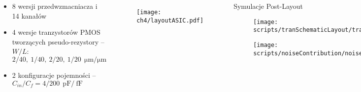 \begin{frame}{}
    \begin{columns}

    \begin{block}{}
        {\renewcommand\normalsize{\small}%
        \normalsize
        \begin{itemize}
            \item 8 wersji przedwzmacniacza i 14 kanałów
            \item 4 wersje tranzystorów PMOS tworzących pseudo-rezystory  --  $W/L$: $2/40,\ 1/40,\ 2/20,\ 1/20\ \SI{}{\micro\metre / \micro\metre}$
            \item 2 konfiguracje pojemności -- $C_{in}/C_f = 4/200\ \SI{}{\pico\farad}/\SI{}{\femto\farad}$
        \end{itemize}
        }
    \end{block}

\vspace{-1em}
    \begin{figure}[H]
        \centering
        \texttt{[image: ch4/layoutASIC.pdf]} 
    \end{figure}   

    \begin{block}{
Symulacje Post-Layout
    }

    \begin{figure}[H]
        \centering
        \texttt{[image: scripts/tranSchematicLayout/tranSchematicLayout.pdf]}  
    \end{figure}
    \vspace{-5mm} %
    \begin{figure}[H]
        \centering
        \texttt{[image: scripts/noiseContribution/noiseContributionOut.pdf]}  
    \end{figure}
    \end{block}
    \end{columns}   
  
\end{frame}



